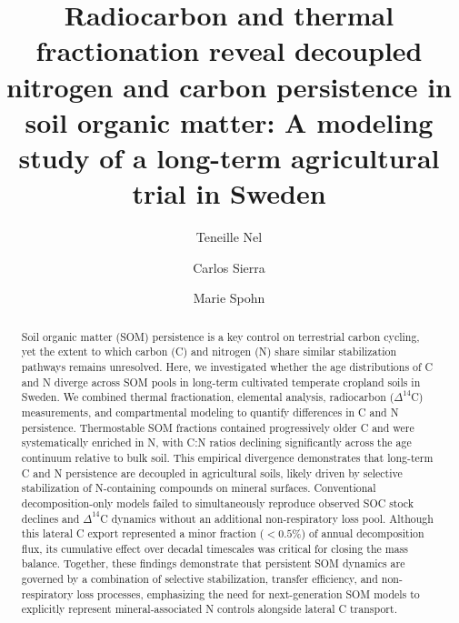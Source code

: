 \documentclass[bg, manuscript]{copernicus}
\begin{document}
\title{Radiocarbon and thermal fractionation reveal decoupled nitrogen and carbon persistence in soil organic matter: A modeling study of a long-term agricultural trial in Sweden}


\author[1]{Teneille Nel}
\author[2]{Carlos Sierra}
\author[3]{Marie Spohn}




\received{}
\pubdiscuss{} %
\revised{}
\accepted{}
\published{}




\maketitle



\begin{abstract}
Soil organic matter (SOM) persistence is a key control on terrestrial carbon cycling, yet the extent to which carbon (C) and nitrogen (N) share similar stabilization pathways remains unresolved. Here, we investigated whether the age distributions of C and N diverge across SOM pools in long-term cultivated temperate cropland soils in Sweden. We combined thermal fractionation, elemental analysis, radiocarbon ($\Delta^{14}$C) measurements, and compartmental modeling to quantify differences in C and N persistence. Thermostable SOM fractions contained progressively older C and were systematically enriched in N, with C:N ratios declining significantly across the age continuum relative to bulk soil. This empirical divergence demonstrates that long-term C and N persistence are decoupled in agricultural soils, likely driven by selective stabilization of N-containing compounds on mineral surfaces. Conventional decomposition-only models failed to simultaneously reproduce observed SOC stock declines and $\Delta^{14}$C dynamics without an additional non-respiratory loss pool. Although this lateral C export represented a minor fraction ($< 0.5\%$) of annual decomposition flux, its cumulative effect over decadal timescales was critical for closing the mass balance. Together, these findings demonstrate that persistent SOM dynamics are governed by a combination of selective stabilization, transfer efficiency, and non-respiratory loss processes, emphasizing the need for next-generation SOM models to explicitly represent mineral-associated N controls alongside lateral C transport.
\end{abstract}
\end{document}
